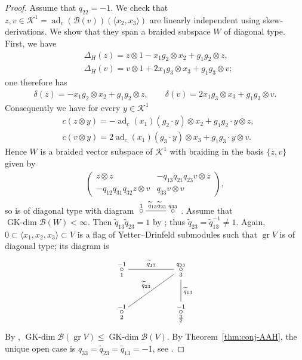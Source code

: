 \documentclass[pdftex]{sigma}
\numberwithin{equation}{section}
\newcommand{\adc}{\operatorname{ad}_c}
\newcommand{\GK}{\operatorname{GK-dim}}
\newcommand{\gr}{\operatorname{gr}}
\newcommand{\toba}{\mathscr B}
\newcommand{\K}{{\mathcal{K}}}
\newcommand{\tresdos}{\frac{3}{2}}
\begin{document}
\begin{proof}
Assume that $q_{22} = -1$.
We check that $z, v \in \K^1 = \adc(\toba(v))(\langle x_2, x_3 \rangle)$ are linearly independent using skew-derivations.
We show that they span a braided subspace $W$ of diagonal type. First, we have
\begin{align*}
&\Delta_{H}(z) = z \otimes 1 - x_1 g_2 \otimes x_2 + g_1g_2 \otimes z , \\
&\Delta_{H}(v) = v \otimes 1 + 2 x_1 g_3 \otimes x_3 + g_1g_3 \otimes v;
\end{align*}
one therefore has
\begin{align*}
\delta(z) = - x_1 g_2 \otimes x_2 + g_1g_2 \otimes z, \qquad
\delta(v) = 2 x_1 g_3 \otimes x_3 + g_1g_3 \otimes v.
\end{align*}
Consequently we have for every $y \in \K^1$
\begin{align*}
&c(z \otimes y) = -\adc(x_1)(g_2 \cdot y) \otimes x_2 + g_1g_2 \cdot y \otimes z, \\
&c(v \otimes y) = 2\adc(x_1)(g_3 \cdot y) \otimes x_3 + g_1g_3 \cdot y \otimes v.
\end{align*}
Hence $W$ is a braided vector subspace of $\K^1$ with braiding in the basis $\{z, v \}$ given by
\begin{align*}
\begin{pmatrix}
z \otimes z & -q_{13}q_{21}q_{23} v \otimes z \\
-q_{12}q_{31}q_{32} z \otimes v & q_{33} v \otimes v
\end{pmatrix}\!,
\end{align*}
so is of diagonal type with diagram $\xymatrix{
\overset{1}{\circ} \ar @{-}[r]^{\widetilde{q}_{13}\widetilde{q}_{23}} & \overset{q_{33}}{\circ} }$.
Assume that $\GK \toba(W) < \infty$.
Then $\widetilde{q}_{13}\widetilde{q}_{23} = 1$ by \cite[Lemma~2.3.7]{AAH-triang}; thus $\widetilde{q}_{23} = \widetilde{q}_{13}^{-1} \neq 1$.
Again, $0 \subset \langle x_1, x_2, x_3\rangle \subset V$ is a flag of Yetter--Drinfeld submodules such that $\gr V$ is of diagonal type; its diagram is
$$
\xymatrix{
\overset{-1}{\underset{1} {\circ}}\ar @{-}[rr]^{\widetilde{q}_{13}} & & \overset{q_{33}} {\underset{3} {\circ}}
\ar @{-}[d]^{\widetilde{q}_{13}} \ar @{-}[dll]_{\widetilde{q}_{23}} \\
\overset{-1}{\underset{2} {\circ}} && \overset{-1}{\underset{\tresdos} {\circ}} }
$$
By \cite[Lemma 3.4.2\,(c)]{AAH-triang}, $\GK \toba(\gr V)\le \GK \toba(V)$.
By Theorem~\ref{thm:conj-AAH}, the unique open case is $q_{33}=\widetilde{q}_{23} = \widetilde{q}_{13} = -1$, see \cite{H-classif-RS}.


\end{proof}
\end{document}
